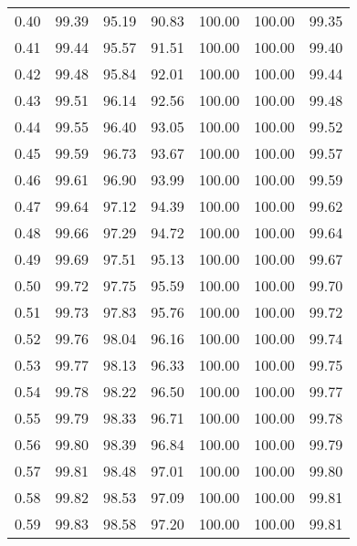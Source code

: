 \begin{tabular}{|c|c|c|c|c|c|c|}
      0.40 &     99.39 &     95.19 &      90.83 &  100.00 &     100.00 &         99.35 \\
      0.41 &     99.44 &     95.57 &      91.51 &  100.00 &     100.00 &         99.40 \\
      0.42 &     99.48 &     95.84 &      92.01 &  100.00 &     100.00 &         99.44 \\
      0.43 &     99.51 &     96.14 &      92.56 &  100.00 &     100.00 &         99.48 \\
      0.44 &     99.55 &     96.40 &      93.05 &  100.00 &     100.00 &         99.52 \\
      0.45 &     99.59 &     96.73 &      93.67 &  100.00 &     100.00 &         99.57 \\
      0.46 &     99.61 &     96.90 &      93.99 &  100.00 &     100.00 &         99.59 \\
      0.47 &     99.64 &     97.12 &      94.39 &  100.00 &     100.00 &         99.62 \\
      0.48 &     99.66 &     97.29 &      94.72 &  100.00 &     100.00 &         99.64 \\
      0.49 &     99.69 &     97.51 &      95.13 &  100.00 &     100.00 &         99.67 \\
      0.50 &     99.72 &     97.75 &      95.59 &  100.00 &     100.00 &         99.70 \\
      0.51 &     99.73 &     97.83 &      95.76 &  100.00 &     100.00 &         99.72 \\
      0.52 &     99.76 &     98.04 &      96.16 &  100.00 &     100.00 &         99.74 \\
      0.53 &     99.77 &     98.13 &      96.33 &  100.00 &     100.00 &         99.75 \\
      0.54 &     99.78 &     98.22 &      96.50 &  100.00 &     100.00 &         99.77 \\
      0.55 &     99.79 &     98.33 &      96.71 &  100.00 &     100.00 &         99.78 \\
      0.56 &     99.80 &     98.39 &      96.84 &  100.00 &     100.00 &         99.79 \\
      0.57 &     99.81 &     98.48 &      97.01 &  100.00 &     100.00 &         99.80 \\
      0.58 &     99.82 &     98.53 &      97.09 &  100.00 &     100.00 &         99.81 \\
      0.59 &     99.83 &     98.58 &      97.20 &  100.00 &     100.00 &         99.81 \\

\end{tabular}
